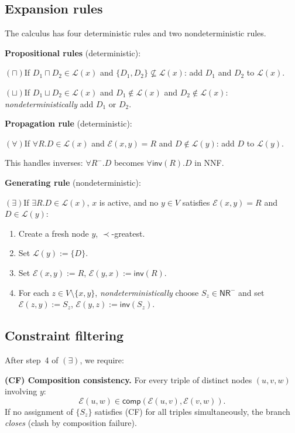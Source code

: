 \documentclass[a4paper,11pt]{article}
\theoremstyle{definition}
\newcommand{\inv}{\ensuremath{\mathsf{inv}}}
\newcommand{\comp}{\ensuremath{\mathsf{comp}}}
\newcommand{\NR}{\ensuremath{\mathsf{NR}}}
\newcommand{\LL}{\ensuremath{\mathcal{L}}}
\newcommand{\EE}{\ensuremath{\mathcal{E}}}
\begin{document}
\subsection{Expansion rules}\label{sec:rules}

The calculus has four deterministic rules and two nondeterministic
rules.

\medskip
\noindent\textbf{Propositional rules} (deterministic):

\smallskip
\noindent$(\sqcap)$\quad If $D_1 \sqcap D_2 \in \LL(x)$ and
$\{D_1, D_2\} \not\subseteq \LL(x)$: add $D_1$ and $D_2$ to
$\LL(x)$.

\smallskip
\noindent$(\sqcup)$\quad If $D_1 \sqcup D_2 \in \LL(x)$ and
$D_1 \notin \LL(x)$ and $D_2 \notin \LL(x)$:
\emph{nondeterministically} add $D_1$ or $D_2$.

\medskip
\noindent\textbf{Propagation rule} (deterministic):

\smallskip
\noindent$(\forall)$\quad If $\forall R.D \in \LL(x)$ and
$\EE(x,y) = R$ and $D \notin \LL(y)$: add $D$ to $\LL(y)$.

\smallskip
\noindent This handles inverses: $\forall R^-.D$ becomes
$\forall \inv(R).D$ in NNF.

\medskip
\noindent\textbf{Generating rule} (nondeterministic):

\smallskip
\noindent$(\exists)$\quad If $\exists R.D \in \LL(x)$, $x$ is
active, and no $y \in V$ satisfies $\EE(x,y) = R$ and
$D \in \LL(y)$:
\begin{enumerate}[nosep,label=\arabic*.]
  \item Create a fresh node $y$, $\prec$-greatest.
  \item Set $\LL(y) := \{D\}$.
  \item Set $\EE(x,y) := R$, $\EE(y,x) := \inv(R)$.
  \item For each $z \in V \setminus \{x,y\}$,
    \emph{nondeterministically} choose
    $S_z \in \NR^{-}$ and set $\EE(z,y) := S_z$,
    $\EE(y,z) := \inv(S_z)$.
\end{enumerate}

\subsection{Constraint filtering}\label{sec:filtering}

After step~4 of $(\exists)$, we require:

\medskip\noindent\textbf{(CF) Composition consistency.}\;
For every triple of distinct nodes $(u,v,w)$ involving $y$:
\[
\EE(u,w) \in \comp(\EE(u,v), \EE(v,w)).
\]
If no assignment of $\{S_z\}$ satisfies (CF) for all triples
simultaneously, the branch \emph{closes} (clash by composition
failure).
\end{document}
